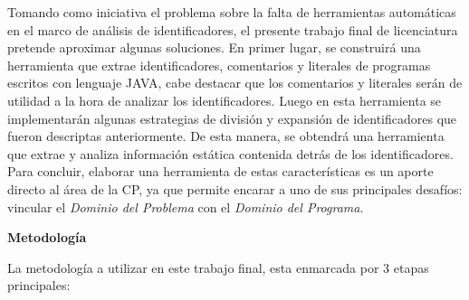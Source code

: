 \documentclass[a4paper,12pt]{article}
\begin{document}
\hspace{0.5cm}Tomando como iniciativa el problema sobre la falta de herramientas automáticas en el marco de análisis de identificadores, el presente trabajo final de licenciatura pretende aproximar algunas soluciones. En primer lugar, se construirá una herramienta que extrae identificadores, comentarios y literales de programas escritos con lenguaje JAVA, cabe destacar que los comentarios y literales serán de utilidad a la hora de analizar los identificadores.
Luego en esta herramienta se implementarán algunas estrategias de división y expansión de identificadores que fueron descriptas anteriormente.
De esta manera, se obtendrá una herramienta que extrae y analiza información estática contenida detrás de los identificadores.
Para concluir, elaborar una herramienta de estas características es un aporte directo al área de la CP, ya que permite encarar a uno de sus principales desafíos: vincular el \textit{Dominio del Problema} con el \textit{Dominio del Programa}.
\vskip0.5cm

\pagebreak
{\Large \textbf{Metodología}}
\vskip0.5cm

\hspace{0.5cm}La metodología a utilizar en este trabajo final, esta enmarcada por 3 etapas principales:
\end{document}
